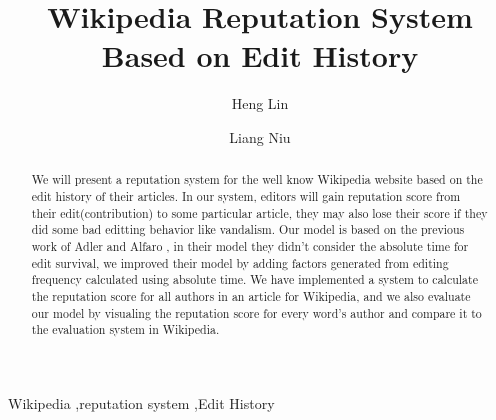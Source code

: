 \documentclass[preprint,review,12pt]{elsarticle}
\begin{document}
\begin{frontmatter}


\title{Wikipedia Reputation System Based on Edit History}




\author[label1]{Heng Lin}
\author[label2]{Liang Niu}
\address[label1]{hl2521@nyu.edu}
\address[label2]{ln932@nyu.edu}

\begin{abstract}
  We will present a reputation system for the well know Wikipedia website based
  on the edit history of their articles. In our system, editors will gain
  reputation score from their edit(contribution) to some particular article,
  they may also lose their score if they did some bad editting behavior like
  vandalism\cite{adler2007content}. Our model is based on the previous work of Adler and
  Alfaro \cite{adler2007content} , in their model they didn't consider the
  absolute time for edit survival, we improved their model by adding factors
  generated from editing frequency calculated using absolute time.
  We have implemented a system to calculate the reputation score for all authors
  in an article for Wikipedia, and we also evaluate our model by visualing the
  reputation score for every word's author and compare it to the evaluation
  system in Wikipedia.
\end{abstract}

\begin{keyword}
Wikipedia \sep reputation system \sep Edit History


\end{keyword}

\end{frontmatter}
\end{document}
